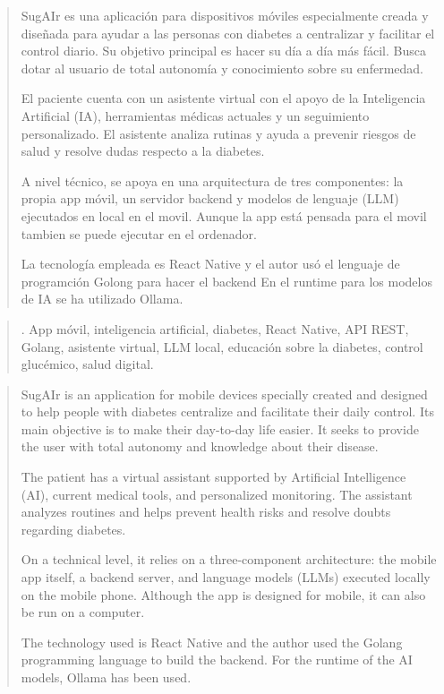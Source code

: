 \documentclass[a4paper,12pt,twoside]{memoir}
\begin{document}
\renewcommand*\abstractname{Resumen}
\begin{abstract}
SugAIr es una aplicación para dispositivos móviles especialmente creada y diseñada para ayudar a las personas con diabetes a centralizar y facilitar el control diario. Su objetivo principal es hacer su día a día más fácil. Busca dotar al usuario de total autonomía y conocimiento sobre su enfermedad.

El paciente cuenta con un asistente virtual con el apoyo de la Inteligencia Artificial (IA), herramientas médicas actuales y un seguimiento personalizado.
El asistente analiza rutinas y ayuda a prevenir riesgos de salud y resolve dudas respecto a la diabetes.

A nivel técnico, se apoya en una arquitectura de tres componentes: la propia app móvil, un servidor backend y modelos de lenguaje (LLM) ejecutados en local en el movil. Aunque la app está pensada para el movil tambien se puede ejecutar en el ordenador.

La tecnología empleada es React Native y el autor usó el lenguaje de programción Golong para hacer el backend
En el runtime para los modelos de IA se ha utilizado Ollama.

\end{abstract}

\renewcommand*\abstractname{Descriptores}
\begin{abstract}.
App móvil, inteligencia artificial, diabetes, React Native, API REST, Golang, asistente virtual, LLM local, educación sobre la diabetes, control glucémico, salud digital.
\end{abstract}

\clearpage

\renewcommand*\abstractname{Abstract}
\begin{abstract}
SugAIr is an application for mobile devices specially created and designed to help people with diabetes centralize and facilitate their daily control. Its main objective is to make their day-to-day life easier. It seeks to provide the user with total autonomy and knowledge about their disease.

The patient has a virtual assistant supported by Artificial Intelligence (AI), current medical tools, and personalized monitoring. The assistant analyzes routines and helps prevent health risks and resolve doubts regarding diabetes.

On a technical level, it relies on a three-component architecture: the mobile app itself, a backend server, and language models (LLMs) executed locally on the mobile phone. Although the app is designed for mobile, it can also be run on a computer.

The technology used is React Native and the author used the Golang programming language to build the backend. For the runtime of the AI models, Ollama has been used.
\end{abstract}
\end{document}
